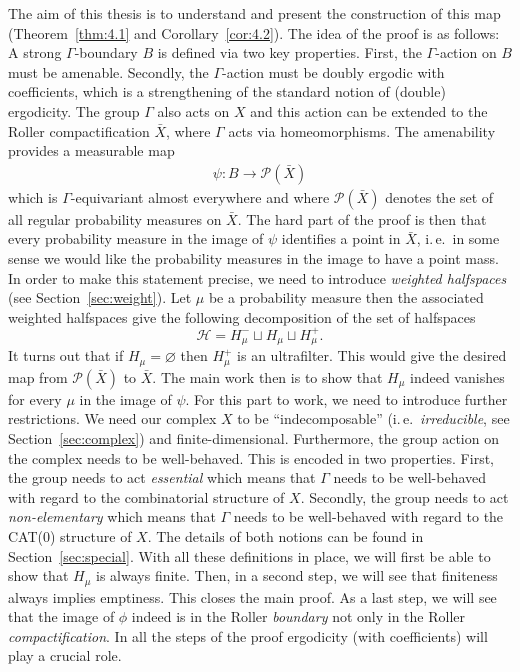 The aim of this thesis is to understand and present the construction of this map (Theorem~\ref{thm:4.1} and Corollary~\ref{cor:4.2}). The idea of the proof is as follows: A strong \(\Gamma\)-boundary \(B\) is defined via two key properties. First, the \(\Gamma\)-action on \(B\) must be amenable. Secondly, the \(\Gamma\)-action must be doubly ergodic with coefficients, which is a strengthening of the standard notion of (double) ergodicity. The group \(\Gamma\) also acts on \(X\) and this action can be extended to the Roller compactification \(\bar X\), where \(\Gamma\) acts via homeomorphisms. The amenability provides a measurable map
\begin{align}
  \psi\colon B \to \mathcal{P}(\bar X)\label{eq:psi}
\end{align}
which is \(\Gamma\)-equivariant almost everywhere and where \(\mathcal{P}(\bar X)\) denotes the set of all regular probability measures on \(\bar X\). The hard part of the proof is then that every probability measure in the image of \(\psi\) identifies a point in \(\bar X\), i.\,e.\ in some sense we would like the probability measures in the image to have a point mass. In order to make this statement precise, we need to introduce \emph{weighted halfspaces} (see Section~\ref{sec:weight}). Let \(\mu\) be a probability measure then the associated weighted halfspaces give the following decomposition of the set of halfspaces
\[
\mathcal{H} = H_\mu^- \sqcup H_\mu \sqcup H_\mu^+.
\]
It turns out that if \(H_\mu = \varnothing\) then \(H_\mu^+\) is an ultrafilter. This would give the desired map from \(\mathcal{P}(\bar X)\) to \(\bar X\). The main work then is to show that \(H_\mu\) indeed vanishes for every \(\mu\) in the image of \(\psi\). For this part to work, we need to introduce further restrictions. We need our complex \(X\) to be \enquote{indecomposable} (i.\,e.\ \emph{irreducible}, see Section~\ref{sec:complex}) and finite-dimensional. Furthermore, the group action on the complex needs to be well-behaved. This is encoded in two properties. First, the group needs to act \emph{essential} which means that \(\Gamma\) needs to be well-behaved with regard to the combinatorial structure of \(X\). Secondly, the group needs to act \emph{non-elementary} which means that \(\Gamma\) needs to be well-behaved with regard to the CAT(0) structure of \(X\). The details of both notions can be found in Section~\ref{sec:special}. With all these definitions in place, we will first be able to show that \(H_\mu\) is always finite. Then, in a second step, we will see that finiteness always implies emptiness. This closes the main proof. As a last step, we will see that the image of \(\phi\) indeed is in the Roller \emph{boundary} not only in the Roller \emph{compactification}. In all the steps of the proof ergodicity (with coefficients) will play a crucial role.

